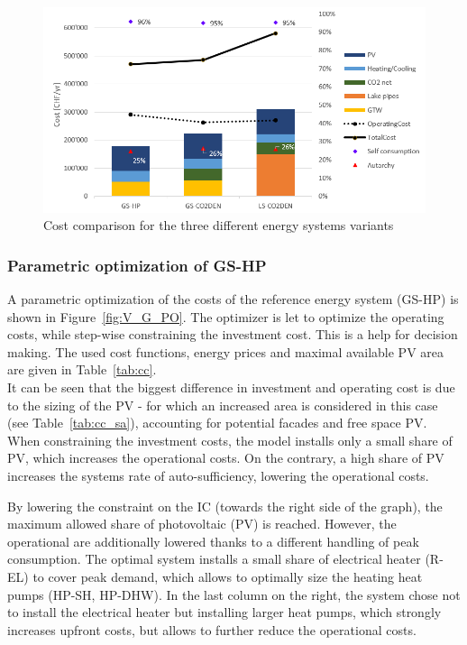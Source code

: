 \documentclass{article}
\begin{document}
\begin{figure}[htp]
	\centering
	\includegraphics[width=1\textwidth]{V_costs.PNG}
	\caption{Cost comparison for the three different energy systems variants}
	\label{fig:V_costs}
\end{figure}


\subsubsection{Parametric optimization of GS-HP}
A parametric optimization of the costs of the reference energy system (GS-HP) is shown in Figure~\ref{fig:V_G_PO}. The optimizer is let to optimize the operating costs, while step-wise constraining the investment cost. This is a help for decision making. The used cost functions, energy prices and maximal available PV area are given in Table~\ref{tab:cc}. \\ 



It can be seen that the biggest difference in investment and operating cost is due to the sizing of the PV - for which an increased area is considered in this case (see Table~\ref{tab:cc_sa}), accounting for potential facades and free space PV. When constraining the investment costs, the model installs only a small share of PV, which increases the operational costs. On the contrary, a high share of PV increases the systems rate of auto-sufficiency, lowering the operational costs. 

By lowering the constraint on the IC (towards the right side of the graph), the maximum allowed share of photovoltaic (PV) is reached. However, the operational are additionally lowered thanks to a different handling of peak consumption. The optimal system installs a small share of electrical heater (R-EL) to cover peak demand, which allows to optimally size the heating heat pumps (HP-SH, HP-DHW). In the last column on the right, the system chose not to install the electrical heater but installing larger heat pumps, which strongly increases upfront costs, but allows to further reduce the operational costs.
\end{document}
